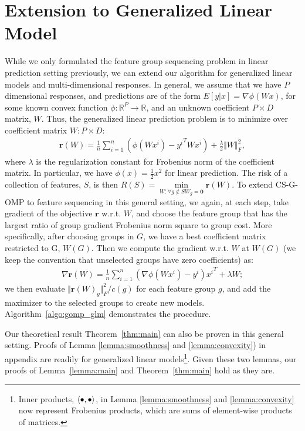 \section{Extension to Generalized Linear Model}
\label{sec:extension}
While we only formulated the feature group sequencing problem in linear prediction setting previously, we can extend our algorithm for generalized linear models\cite{glm} and multi-dimensional responses. In general, we assume that we have $P$ dimensional responses, and predictions are of the form $E[y | x ] = \nabla \phi( W x)$, for some known convex function $\phi : \mathbb{R}^P \rightarrow \mathbb{R}$, and an unknown coefficient $P\times D$ matrix, $W$. Thus, the generalized linear
prediction problem is to minimize over coefficient matrix $W: P\times D$:
\begin{align}
	\textbf{r}(W) = \frac{1}{n} \sum _{i=1}^n (\phi(Wx^i) - {y^i}^TWx^i) 
		+ \frac{\lambda}{2} \Vert W\Vert^2_F,
		\label{eq:glm_loss}
\end{align}
where $\lambda$ is the regularization constant for Frobenius norm of the coefficient 
matrix. In particular, we have $\phi(x) = \frac{1}{2}x^2$ for linear prediction. 
The risk of a collection of features, $S$, is then 
\mbox{$R(S) = \underset{W : \forall g \notin S  W_g = \textbf{0} }{\min} \textbf{r}(W)$}. 
To extend CS-G-OMP to feature sequencing in this general setting, we again, at each step,
take gradient of the objective $\textbf{r}$ w.r.t. $W$, and choose the feature group that has the largest ratio of group gradient Frobenius norm square to group cost. More specifically, after choosing groups in $G$, we have a best coefficient matrix restricted to G, $W(G)$. Then we compute the gradient w.r.t. $W$ at $W(G)$ (we keep the convention that unselected groups have zero coefficients) as:
\begin{align}
	\nabla \textbf{r}(W) = \frac{1}{n} \sum _{i=1}^n (\nabla \phi(Wx^i) - y^i){x^i}^T + \lambda W;
	\label{eq:glm_gradient}
\end{align}
we then evaluate $\Vert \textbf{r}(W)_g \Vert_F^2 / c(g)$ for each feature group $g$, and add the maximizer to the selected groups to create new models. 
Algorithm~\ref{algo:gomp_glm} demonstrates the procedure. 

Our theoretical result Theorem~\ref{thm:main} can also be proven in this general setting. 
Proofs of Lemma \ref{lemma:smoothness} and \ref{lemma:convexity}) in appendix are readily for generalized linear models\footnote{Inner products, $\langle \bullet, \bullet \rangle$, in Lemma \ref{lemma:smoothness} and \ref{lemma:convexity} now represent Frobenius products, which are sums of element-wise products of matrices.}. Given these two lemmas, our proofs of Lemma~\ref{lemma:main}
and Theorem~\ref{thm:main} hold as they are. 


